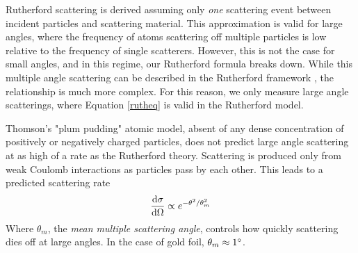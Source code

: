 Rutherford scattering is derived assuming only \textit{one} scattering event between incident particles and scattering material. This approximation is valid for large angles, where the frequency of atoms scattering off multiple particles is low relative to the frequency of single scatterers. However, this is not the case for small angles, and in this regime, our Rutherford formula breaks down. While this multiple angle scattering can be described in the Rutherford framework \cite{scatter}, the relationship is much more complex. For this reason, we only measure large angle scatterings, where Equation \ref{rutheq} is valid in the Rutherford model.

Thomson's "plum pudding" atomic model, absent of any dense concentration of positively or negatively charged particles, does not predict large angle scattering at as high of a rate as the Rutherford theory. Scattering is produced only from weak Coulomb interactions as particles pass by each other. This leads to a predicted scattering rate
\begin{equation}
  \dv{\sigma}{\Omega} \propto e^{-\theta^2/\theta_m^2}
\end{equation}
Where $\theta_m$, the \textit{mean multiple scattering angle}, controls how quickly scattering dies off at large angles. In the case of gold foil, $\theta_m \approx 1\degree$. 

